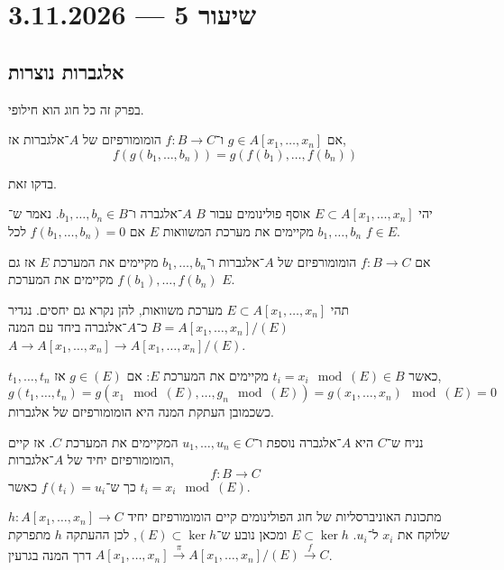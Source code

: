\section{שיעור 5 --- 3.11.2026}
\subsection{אלגברות נוצרות}
בפרק זה כל חוג הוא חילופי.
\begin{proposition}
	אם $g \in A[x_1, \ldots, x_n]$ ו־$f : B \to C$ הומומורפיזם של $A$־אלגברות אז,
	\[
		f(g(b_1, \ldots, b_n))
		= g(f(b_1), \ldots, f(b_n))
	\]
\end{proposition}
\begin{exercise}
	בדקו זאת.
\end{exercise}
\begin{definition}
	יהי $E \subset A[x_1, \ldots, x_n]$ אוסף פולינומים עבור $B$ $A$־אלגברה ו־$b_1, \ldots, b_n \in B$.
	נאמר ש־$b_1, \ldots, b_n$ מקיימים את מערכת המשוואות $E$ אם $f(b_1, \ldots, b_n) = 0$ לכל $f \in E$.
\end{definition}
\begin{corollary}
	אם $f : B \to C$ הומומורפיזם של $A$־אלגברות ו־$b_1, \ldots, b_n$ מקיימים את המערכת $E$ אז גם $f(b_1), \ldots, f(b_n)$ מקיימים את המערכת $E$.
\end{corollary}
\begin{definition}
	תהי $E \subset A[x_1, \ldots, x_n]$ מערכת משוואות, להן נקרא גם יחסים.
	נגדיר $B = A[x_1, \ldots, x_n] / (E)$ כ־$A$־אלגברה ביחד עם המנה $A \to A[x_1, \ldots, x_n] \to A[x_1, \ldots, x_n] / (E)$.
\end{definition}
\begin{remark}
	$t_1, \ldots, t_n$ כאשר $t_i = x_i \mod (E) \in B$ מקיימים את המערכת $E$:
	אם $g \in (E)$ אז,
	\[
		g(t_1, \ldots, t_n)
		= g(x_1 \mod (E), \ldots, g_n \mod (E))
		= g(x_1, \ldots, x_n) \mod (E)
		= 0
	\]
	כשכמובן העתקת המנה היא הומומורפיזם של אלגברות.
\end{remark}
\begin{theorem}
	נניח ש־$C$ היא $A$־אלגברה נוספת ו־$u_1, \ldots, u_n \in C$ המקיימים את המערכת $C$.
	אז קיים הומומורפיזם יחיד של $A$־אלגברות,
	\[
		f : B \to C
	\]
	כך ש־$f(t_i) = u_i$ כאשר $t_i = x_i \mod (E)$.
\end{theorem}
מתכונת האוניברסליות של חוג הפולינומים קיים הומומורפיזם יחיד $h : A[x_1, \ldots, x_n] \to C$ שלוקח את $x_i$ ל־$u_i$.
$E \subset \ker h$ ומכאן נובע ש־$(E) \subset \ker h$, לכן ההעתקה $h$ מתפרקת דרך המנה בגרעין $A[x_1, \ldots, x_n] \xrightarrow{\pi} A[x_1, \ldots, x_n] / (E) \xrightarrow{f} C$.

